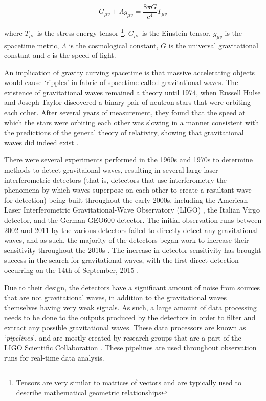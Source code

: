 \documentclass{article}
\begin{document}
\begin{equation}
    G_{\mu{}v} + \Lambda{}g_{\mu{}v} = \dfrac{8\pi{}G}{c^4}T_{\mu{}v}
\end{equation}

where \(T_{\mu{}v}\) is the stress-energy tensor \footnote{Tensors are very similar to matrices of
vectors and are typically used to describe mathematical geometric relationships}, \(G_{\mu{}v}\) is
the Einstein tensor, \(g_{\mu{}v}\) is the spacetime metric, \(\Lambda\) is the cosmological
constant, \(G\) is the universal gravitational constant and \(c\) is the speed of light.

An implication of gravity curving spacetime is that massive accelerating objects would cause
`ripples' in fabric of spacetime called gravitational waves. The existence of gravitational waves
remained a theory until 1974, when Russell Hulse and Joseph Taylor discovered a binary pair of
neutron stars that were orbiting each other. After several years of measurement, they found that
the speed at which the stars were orbiting each other was slowing in a manner consistent with the
predictions of the general theory of relativity, showing that gravitational waves did indeed exist
\cite{GravDiscovery}.

There were several experiments performed in the 1960s and 1970s to determine methods to detect
gravitaional waves, resulting in several large laser interferometric detectors (that is, detectors
that use interferometry \textendash{} the phenomena by which waves superpose on each other to create
a resultant wave \textendash{} for detection) being built throughout the early 2000s, including the
American Laser Interferometric Gravitational-Wave Observatory (LIGO) \cite{LIGO}, the Italian Virgo
\cite{virgo} detector, and the German GEO600 detector. The initial observation runs between 2002 and
2011 by the various detectors failed to directly detect any gravitational waves, and as such, the
majority of the detectors began work to increase their sensitivity throughout the 2010s
\cite{aligo}.  The increase in detector sensitivity has brought success in the search for
gravitational waves, with the first direct detection occurring on the 14th of September, 2015
\cite{FirstDetectionPaper}\cite{DetectionWeb}.

Due to their design, the detectors have a significant amount of noise from sources that are not
gravitational waves, in addition to the gravitational waves themselves having very weak signals. As
such, a large amount of data processing needs to be done to the outputs produced by the detectors
in order to filter and extract any possible gravitational waves. These data processors are known as
`\textit{pipelines}', and are mostly created by research groups that are a part of the LIGO
Scientific Collaboration \cite{LSC}. These pipelines are used throughout observation runs for
real-time data analysis.
\end{document}
